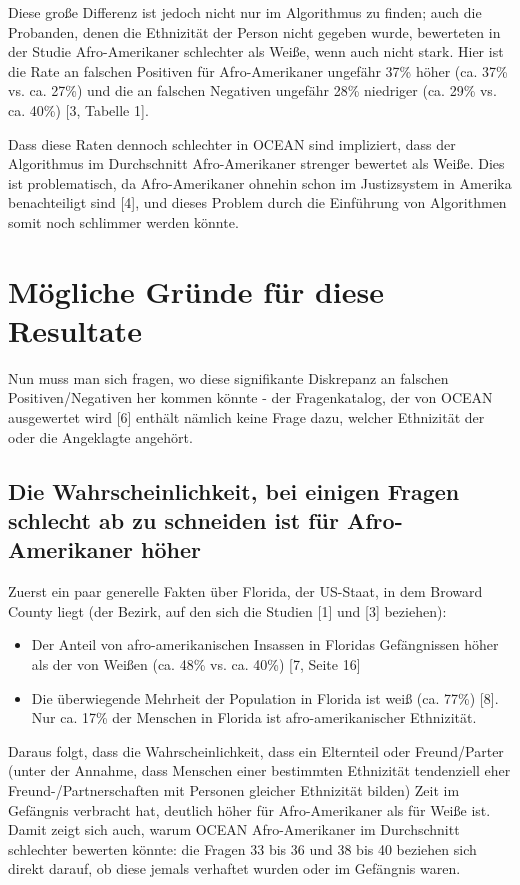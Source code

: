 \documentclass[10pt, a4paper, twocolumn]{article} %
\begin{document}
Diese große Differenz ist jedoch nicht nur im Algorithmus zu finden; auch die Probanden, denen die Ethnizität der Person nicht gegeben wurde, bewerteten in der Studie Afro-Amerikaner schlechter als Weiße, wenn auch nicht stark. 
Hier ist die Rate an falschen Positiven für Afro-Amerikaner ungefähr 37\% höher (ca. 37\% vs. ca. 27\%) und die an falschen Negativen ungefähr 28\% niedriger (ca. 29\% vs. ca. 40\%) [3, Tabelle 1].

Dass diese Raten dennoch schlechter in OCEAN sind impliziert, dass der Algorithmus im Durchschnitt Afro-Amerikaner strenger bewertet als Weiße. 
Dies ist problematisch, da Afro-Amerikaner ohnehin schon im Justizsystem in Amerika benachteiligt sind [4], und dieses Problem durch die Einführung von Algorithmen somit noch schlimmer werden könnte.

\FloatBarrier

\section{Mögliche Gründe für diese Resultate}
Nun muss man sich fragen, wo diese signifikante Diskrepanz an falschen Positiven/Negativen her kommen könnte - der Fragenkatalog, der von OCEAN ausgewertet wird [6] enthält nämlich keine Frage dazu, welcher Ethnizität der oder die Angeklagte angehört. 

\subsection{Die Wahrscheinlichkeit, bei einigen Fragen schlecht ab zu schneiden ist für Afro-Amerikaner höher}
Zuerst ein paar generelle Fakten über Florida, der US-Staat, in dem Broward County liegt (der Bezirk, auf den sich die Studien [1] und [3] beziehen): 
\begin{itemize} 
  \item{} Der Anteil von afro-amerikanischen Insassen in Floridas Gefängnissen höher als der von Weißen (ca. 48\% vs. ca. 40\%) [7, Seite 16]
  \item{} Die überwiegende Mehrheit der Population in Florida ist weiß (ca. 77\%) [8]. Nur ca. 17\% der Menschen in Florida ist afro-amerikanischer Ethnizität.
\end{itemize}

Daraus folgt, dass die Wahrscheinlichkeit, dass ein Elternteil oder Freund/Parter (unter der Annahme, dass Menschen einer bestimmten Ethnizität tendenziell eher Freund-/Partnerschaften mit Personen gleicher Ethnizität bilden) Zeit im Gefängnis verbracht hat, deutlich höher für Afro-Amerikaner als für Weiße ist.
Damit zeigt sich auch, warum OCEAN Afro-Amerikaner im Durchschnitt schlechter bewerten könnte: die Fragen 33 bis 36 und 38 bis 40 beziehen sich direkt darauf, ob diese jemals verhaftet wurden oder im Gefängnis waren. 
\end{document}
